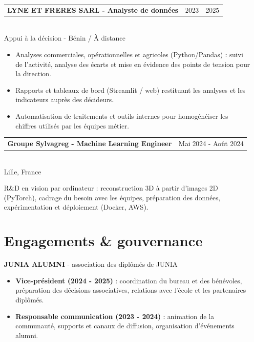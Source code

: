 \documentclass[10pt,a4paper]{article}
\makeatletter
\newcommand{\role}[3]{%
  \vspace{2pt}
  \begin{tabularx}{\linewidth}{@{}Xr@{}}
  \textbf{#1} & {\color{muted}#2}
  \end{tabularx}\vspace{0.8pt}\\
  {\color{muted}#3}\par
  \vspace{2pt}
}
\newlength{\maincolumnheight}
\newlength{\sideboxheight}
\makeatother
\begin{document}
\begin{lrbox}{\maincolumnbox}
\begin{minipage}[t]{0.695\textwidth}
\vspace{4pt}
\role{LYNE ET FRERES SARL - Analyste de données}{2023 - 2025}{Appui à la décision - Bénin / À distance}
\begin{itemize}
  \item Analyses commerciales, opérationnelles et agricoles (Python/Pandas) : suivi de l'activité, analyse des écarts et mise en évidence des points de tension pour la direction.
  \item Rapports et tableaux de bord (Streamlit / web) restituant les analyses et les indicateurs auprès des décideurs.
  \item Automatisation de traitements et outils internes pour homogénéiser les chiffres utilisés par les équipes métier.
\end{itemize}

\vspace{4pt}
\role{Groupe Sylvagreg - Machine Learning Engineer}{Mai 2024 - Août 2024}{Lille, France}
R\&D en vision par ordinateur : reconstruction 3D à partir d'images 2D (PyTorch), cadrage du besoin avec les équipes, préparation des données, expérimentation et déploiement (Docker, AWS).\par

\section{Engagements \& gouvernance}
\textbf{JUNIA ALUMNI} - association des diplômés de JUNIA\\
\begin{itemize}
  \item \textbf{Vice-président (2024 - 2025)} : coordination du bureau et des bénévoles, préparation des décisions associatives, relations avec l'école et les partenaires diplômés.
  \item \textbf{Responsable communication (2023 - 2024)} : animation de la communauté, supports et canaux de diffusion, organisation d'événements alumni.
\end{itemize}

\end{minipage}
\end{lrbox}
\setlength{\maincolumnheight}{\dimexpr\ht\maincolumnbox+\dp\maincolumnbox\relax}
\setlength{\sideboxheight}{\dimexpr\maincolumnheight+14pt\relax}
\end{document}
